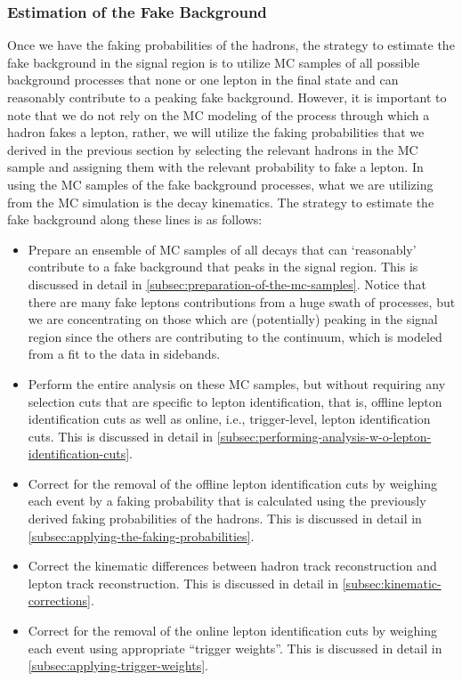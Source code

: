 \subsubsection{Estimation of the Fake Background}
Once we have the faking probabilities of the hadrons, the strategy to estimate the fake background in the signal region is to utilize MC samples of all possible background processes that none or one lepton in the final state and can reasonably contribute to a peaking fake background. %
However, it is important to note that we do not rely on the MC modeling of the process through which a hadron fakes a lepton, rather, we will utilize the faking probabilities that we derived in the previous section by selecting the relevant hadrons in the MC sample and assigning them with the relevant probability to fake a lepton. %
In using the MC samples of the fake background processes, what we are utilizing from the MC simulation is the decay kinematics. %
The strategy to estimate the fake background along these lines is as follows:
\begin{itemize}
    \item Prepare an ensemble of MC samples of all decays that can `reasonably' contribute to a fake background that peaks in the signal region. This is discussed in detail in \ref{subsec:preparation-of-the-mc-samples}. Notice that there are many fake leptons contributions from a huge swath of processes, but we are concentrating on those which are (potentially) peaking in the signal region since the others are contributing to the continuum, which is modeled from a fit to the data in sidebands. %
    \item Perform the entire analysis on these MC samples, but without requiring any selection cuts that are specific to lepton identification, that is, offline lepton identification cuts as well as online, i.e., trigger-level, lepton identification cuts. This is discussed in detail in \ref{subsec:performing-analysis-w-o-lepton-identification-cuts}.
    \item Correct for the removal of the offline lepton identification cuts by weighing each event by a faking probability that is calculated using the previously derived faking probabilities of the hadrons. This is discussed in detail in \ref{subsec:applying-the-faking-probabilities}. %
    \item Correct the kinematic differences between hadron track reconstruction 
    and lepton track reconstruction. This is discussed in detail in \ref{subsec:kinematic-corrections}. %
    \item Correct for the removal of the online lepton identification cuts by weighing each event using appropriate ``trigger weights''. This is discussed in detail in \ref{subsec:applying-trigger-weights}. %
\end{itemize}
